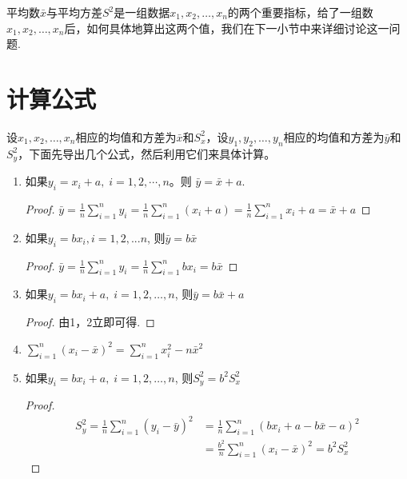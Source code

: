 平均数$\bar x$与平均方差$S^2$是一组数据$x_1,x_2,\ldots,x_{n}$的两个重要指标，给了一组数$x_1,x_2,\ldots,x_{n}$后，如何具体地算出这两个值，我们在下一小节中来详细讨论这一问题.

\section*{计算公式}
设$x_1,x_2,\ldots,x_{n}$相应的均值和方差为$\bar x$和$S^2_x$，设$y_1,y_2,\ldots,y_{n}$相应的均值和方差为$\bar y$和$S^2_y$，下面先导出几个公式，然后利用它们来具体计算。

\begin{enumerate}
    \item 如果$y_i=x_i+a,\; i=1,2,\cdots,n$。则 $\bar {y}= \bar{x} + a$.
    
\begin{proof}
     $\bar{y} = \frac 1n\sum\limits_{i= 1}^{n}y_{i}= \frac 1n\sum\limits _{i= 1}^{n} ({x_{i}+ a}) = \frac 1n\sum\limits _{i= 1}^{n}x_{i}+ a= \bar x+ a$
\end{proof}
    
\item 如果$y_i=bx_i,i=1,2,...n$, 则$\bar{y}=b\bar{x}$

\begin{proof}
$\bar y= {\frac 1n}\sum\limits _{i= 1}^{n}y_{i}= {\frac 1n}\sum\limits _{i= 1}^{n}bx_{i}= b {\bar {x}}$
\end{proof}

    \item 如果$y_i= bx_{i}+ a,\; i= 1, 2, \ldots, n$, 则$\bar {y}=b\bar{x} + a$
  
\begin{proof}
    由1，2立即可得.
\end{proof}  
    \item $\sum\limits _{i= 1}^{n}\left (  x_{i}- \bar {x} \right ) ^{2}= \sum\limits _{i= 1}^{n}x_{i}^{2}- n\bar {x}^{2}$

\item 如果$y_i=bx_i+a,\; i=1,2,\ldots,n$, 则$S_y^{2}=b^{2}S_{x}^{2}$

\begin{proof}
\[\begin{split}
    S_{y}^{2}= {\frac 1n}\sum\limits  _{i= 1}^{n}(y_{i}- \bar{y})^2&=\frac{1}{n}\sum\limits ^n_{i=1}\left ( bx_{i}+ a- b\bar{x} - a\right ) ^{2}\\
    &=\frac{b^{2}}{n}\sum\limits _{i=1}^{n}(x_{i}-\bar{x})^{2}=b^{2}S_{x}^{2}
\end{split}\]
\end{proof}
\end{enumerate}

